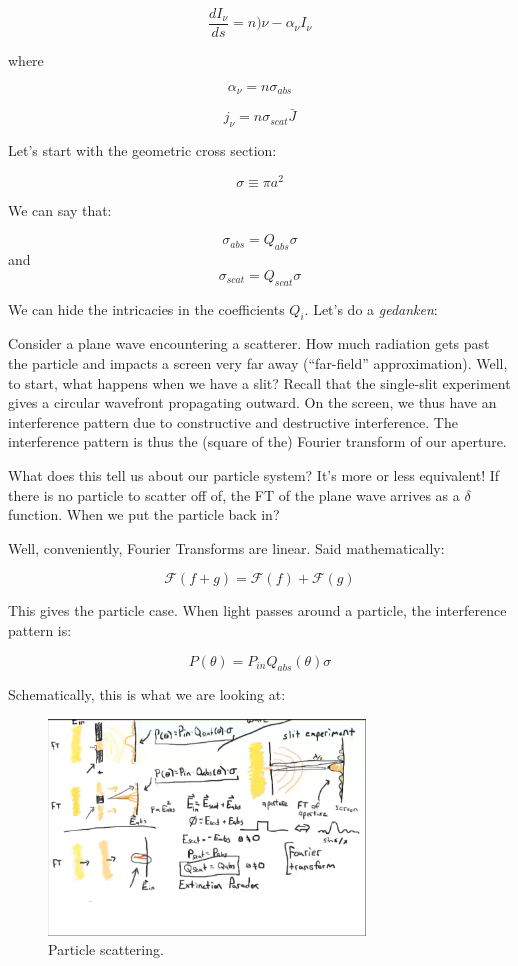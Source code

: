 \documentclass{article}
\begin{document}
$$
\frac{dI_\nu}{ds} = n)\nu - \alpha_\nu I_\nu
$$

where

$$
\alpha_\nu = n \sigma_{abs}
$$

$$
j_\nu = n \sigma_{scat} \bar{J}
$$

Let's start with the geometric cross section:

$$
\sigma \equiv \pi a^2 
$$

We can say that:

$$
\sigma_{abs} = Q_{abs} \sigma
$$
and
$$
\sigma_{scat} = Q_{scat} \sigma
$$

We can hide the intricacies in the coefficients $Q_i$. Let's do a \textit{gedanken}:

Consider a plane wave encountering a scatterer. How much radiation gets past the particle and impacts a screen very far away (``far-field'' approximation). Well, to start, what happens when we have a slit? Recall that the single-slit experiment gives a circular wavefront propagating outward. On the screen, we thus have an interference pattern due to constructive and destructive interference. The interference pattern is thus the (square of the) Fourier transform of our aperture. 

What does this tell us about our particle system? It's more or less equivalent! If there is no particle to scatter off of, the FT of the plane wave arrives as a $\delta$ function. When we put the particle back in? 

Well, conveniently, Fourier Transforms are linear. Said mathematically:

$$
\mathcal{F}\left(f+g\right) = \mathcal{F}\left(f\right) + \mathcal{F}\left(g\right)
$$

This gives the particle case. When light passes around a particle, the interference pattern is:

$$
P\left(\theta\right) = P_{in} Q_{abs}\left(\theta\right) \sigma
$$

Schematically, this is what we are looking at:

\begin{figure}
    \centering
    \includegraphics[width=0.75\textwidth]{Screen Shot 2020-11-14 at 6.03.52 PM.png}
    \caption{Particle scattering. }
    \label{fig:sc}
\end{figure}
\end{document}
